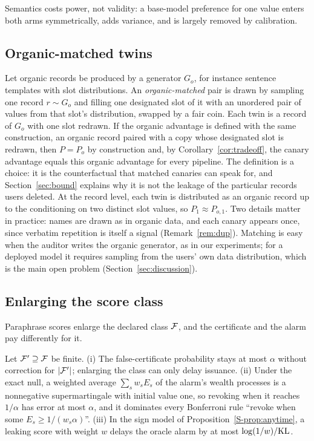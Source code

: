 Semantics costs power, not validity: a base-model preference for one value enters both arms
symmetrically, adds variance, and is largely removed by calibration.

\subsection{Organic-matched twins}\label{sec:matched}

Let organic records be produced by a generator $G_o$, for instance sentence templates with
slot distributions. An \emph{organic-matched} pair is drawn by sampling one record $r\sim G_o$
and filling one designated slot of it with an unordered pair of values from that slot's
distribution, swapped by a fair coin. Each twin is a record of $G_o$ with one slot redrawn.
If the organic advantage is defined with the same construction, an organic record paired
with a copy whose designated slot is redrawn, then $P=P_o$ by construction and, by
Corollary~\ref{cor:tradeoff}, the canary advantage equals this organic advantage for every
pipeline. The definition is a choice: it is the counterfactual that matched canaries can speak
for, and Section~\ref{sec:bound} explains why it is not the leakage of the particular records
users deleted. At the record level, each twin is distributed as an organic record up to the
conditioning on two distinct slot values, so $P_1\approx P_{o,1}$. Two details matter in practice: names are drawn as in organic data, and each canary appears
once, since verbatim repetition is itself a signal (Remark~\ref{rem:dup}). Matching is easy
when the auditor writes the organic generator, as in our experiments; for a deployed model it
requires sampling from the users' own data distribution, which is the main open problem
(Section~\ref{sec:discussion}).

\subsection{Enlarging the score class}\label{sec:class}

Paraphrase scores enlarge the declared class $\mathcal{F}$, and the certificate and the alarm pay
differently for it.

\begin{proposition}\label{prop:class}
Let $\mathcal{F}'\supseteq\mathcal{F}$ be finite. (i) The false-certificate probability stays at most $\alpha$
without correction for $|\mathcal{F}'|$; enlarging the class can only delay issuance. (ii) Under the
exact null, a weighted average $\sum_sw_sE_s$ of the alarm's wealth processes is a
nonnegative supermartingale with initial value one, so revoking when it reaches $1/\alpha$
has error at most $\alpha$, and it dominates every Bonferroni rule ``revoke when some
$E_s\ge1/(w_s\alpha)$''. (iii) In the sign model of Proposition~\ref{S-prop:anytime}, a
leaking score with weight $w$ delays the oracle alarm by at most $\log(1/w)/\mathrm{KL}$.
\end{proposition}

